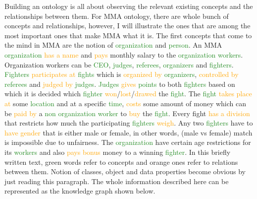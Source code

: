 \documentclass[a4paper]{article}
\begin{document}
Building an ontology is all about observing the relevant existing concepts and the relationships between them. For MMA ontology, there are whole bunch of concepts and relationships, however, 
I will illustrate the ones that are among the most important ones that make MMA what it is. The first concepts that come to the mind in MMA are the notion of 
\textcolor{ForestGreen}{organization} and \textcolor{ForestGreen}{person}. An MMA \textcolor{ForestGreen}{organization} \textcolor{orange}{has a name} and 
\textcolor{orange}{pays} monthly salary to the \textcolor{ForestGreen}{organization workers}. Organization workers can be \textcolor{ForestGreen}{CEO}, \textcolor{ForestGreen}{judges}, 
\textcolor{ForestGreen}{referees}, \textcolor{ForestGreen}{organizers} and \textcolor{ForestGreen}{fighters}. \textcolor{ForestGreen}{Fighters} \textcolor{orange}{participates at} 
\textcolor{ForestGreen}{fights} which is \textcolor{orange}{organized by} \textcolor{ForestGreen}{organizers}, \textcolor{orange}{controlled by} \textcolor{ForestGreen}{referees} and
\textcolor{orange}{judged by} \textcolor{ForestGreen}{judges}. \textcolor{ForestGreen}{Judges} \textcolor{orange}{gives} \textcolor{ForestGreen}{points} to both \textcolor{ForestGreen}{fighters} 
based on which it is decided which \textcolor{ForestGreen}{fighter} \textcolor{orange}{won}/\textcolor{orange}{lost}/\textcolor{orange}{drawed} the \textcolor{ForestGreen}{fight}.
The \textcolor{ForestGreen}{fight} \textcolor{orange}{takes place at} some \textcolor{ForestGreen}{location} and at a specific \textcolor{ForestGreen}{time}, \textcolor{orange}{costs} some 
amount of money which can be \textcolor{orange}{paid by} a \textcolor{ForestGreen}{non organization worker} to \textcolor{orange}{buy} the \textcolor{ForestGreen}{fight}. Every fight 
\textcolor{orange}{has a division} that restricts how much the participating \textcolor{ForestGreen}{fighters} \textcolor{orange}{weigh}. Any two \textcolor{ForestGreen}{fighters} 
have to \textcolor{orange}{have gender} that is either male or female, in other words, (male vs female) match is impossible due to unfairness. The \textcolor{ForestGreen}{organization} 
have certain age restrictions for its \textcolor{ForestGreen}{workers} and also \textcolor{orange}{pays bonus} money to a winning \textcolor{ForestGreen}{fighter}.
In this briefly written text, green words refer to concepts and orange ones refer to relations between them. Notion of classes, object and data properties become obvious by just reading this paragraph. 
The whole information described here can be represented as the knowledge graph shown below.
\end{document}
